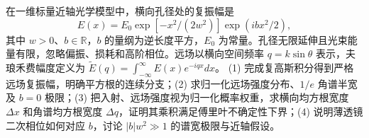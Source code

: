 在一维标量近轴光学模型中，横向孔径处的复振幅是
\[
E(x)=E_0\exp[-x^2/(2w^2)]\exp(i b x^2/2),
\]
其中 \(w>0\)、\(b\in\mathbb R\)，\(b\) 的量纲为逆长度平方，\(E_0\) 为常量。孔径无限延伸且光束能量有限，忽略偏振、损耗和高阶相位。远场以横向空间频率 \(q=k\sin\theta\) 表示，夫琅禾费幅度定义为 \(\widetilde E(q)=\int_{-\infty}^\infty E(x)e^{-iqx}dx\)。
(1) 完成复高斯积分得到严格远场复振幅，明确平方根的连续分支；(2) 求归一化远场强度分布、\(1/e\) 角谱半宽及 \(b=0\) 极限；(3) 把入射、远场强度视为归一化概率权重，求横向均方根宽度 \(\Delta x\) 和角谱均方根宽度 \(\Delta q\)，证明其乘积满足傅里叶不确定性下界；(4) 说明薄透镜二次相位如何对应 \(b\)，讨论 \(|b|w^2\gg1\) 的谱宽极限与近轴假设。
